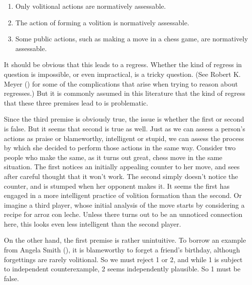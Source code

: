\documentclass[
  11pt,
  letterpaper,
  DIV=11,
  numbers=noendperiod,
  oneside]{scrartcl}
\providecommand{\tightlist}{%
  \setlength{\itemsep}{0pt}\setlength{\parskip}{0pt}}\usepackage{longtable,booktabs,array}
\begin{document}
\begin{enumerate}
\def\labelenumi{\arabic{enumi}.}
\tightlist
\item
  Only volitional actions are normatively assessable.
\item
  The action of forming a volition is normatively assessable.
\item
  Some public actions, such as making a move in a chess game, are
  normatively assessable.
\end{enumerate}

It should be obvious that this leads to a regress. Whether the kind of
regress in question is impossible, or even impractical, is a tricky
question. (See Robert K. Meyer () for some
of the complications that arise when trying to reason about regresses.)
But it is commonly assumed in this literature that the kind of regress
that these three premises lead to is problematic.

Since the third premise is obviously true, the issue is whether the
first or second is false. But it seems that second is true as well. Just
as we can assess a person's actions as praise or blameworthy,
intelligent or stupid, we can assess the process by which she decided to
perform those actions in the same way. Consider two people who make the
same, as it turns out great, chess move in the same situation. The first
notices an initially appealing counter to her move, and sees after
careful thought that it won't work. The second simply doesn't notice the
counter, and is stumped when her opponent makes it. It seems the first
has engaged in a more intelligent practice of volition formation than
the second. Or imagine a third player, whose initial analysis of the
move starts by considering a recipe for arroz con leche. Unless there
turns out to be an unnoticed connection here, this looks even less
intelligent than the second player.

On the other hand, the first premise is rather unintuitive. To borrow an
example from Angela Smith (), it is
blameworthy to forget a friend's birthday, although forgettings are
rarely volitional. So we must reject 1 or 2, and while 1 is subject to
independent counterexample, 2 seems independently plausible. So 1 must
be false.
\end{document}
